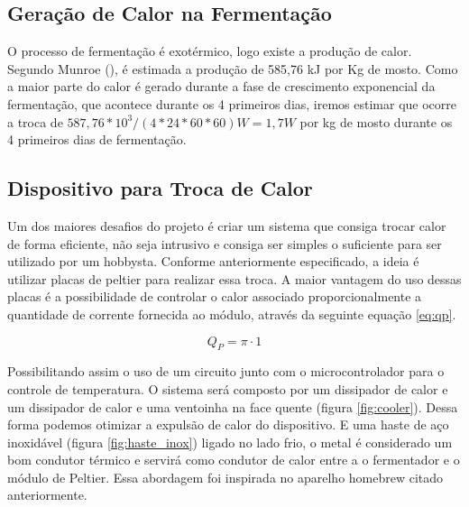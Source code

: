 \subsection{Geração de Calor na Fermentação}

O processo de fermentação é exotérmico, logo existe a produção de calor. Segundo Munroe (), é estimada a produção de 585,76 kJ por Kg de mosto. Como a maior parte do calor é gerado durante a fase de crescimento exponencial da fermentação, que acontece durante os 4 primeiros dias, iremos estimar que ocorre a troca de \(587,76 * 10^3 / (4*24*60*60)W = 1,7 W\) por kg de mosto durante os 4 primeiros dias de fermentação.   

\subsection{Dispositivo para Troca de Calor}

Um dos maiores desafios do projeto é criar um sistema que consiga trocar calor de forma eficiente, não seja intrusivo e consiga ser simples o suficiente para ser utilizado por um hobbysta. Conforme anteriormente especificado, a ideia é utilizar placas de peltier para realizar essa troca. A maior vantagem do uso dessas placas é a possibilidade de controlar o calor associado proporcionalmente a quantidade de corrente fornecida ao módulo, através da seguinte equação \ref{eq:qp}.

\begin{equation}
    Q_P = \pi \cdot 1
    \label{eq:qp}
\end{equation}

Possibilitando assim o uso de um circuito junto com o microcontrolador para o controle de temperatura. 
O sistema será composto por um dissipador de calor e um dissipador de calor e uma ventoinha na face quente (figura \ref{fig:cooler}). Dessa forma podemos otimizar a expulsão de calor do dispositivo. E uma haste de aço inoxidável (figura \ref{fig:haste_inox}) ligado no lado frio, o metal é considerado um bom condutor térmico e servirá como condutor de calor entre a o fermentador e o módulo de Peltier. Essa abordagem foi inspirada no aparelho homebrew citado anteriormente. 

